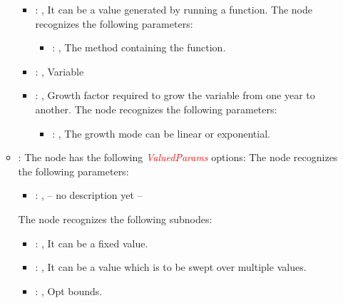\begin{itemize}
\begin{itemize}
\begin{itemize}
            \item {}: , 
              It can be a value generated by running a function.
              The  node recognizes the following parameters:
                \begin{itemize}
                  \item {}: , 
                    The method containing the function.
              \end{itemize}

            \item {}: , 
              Variable

            \item {}: , 
              Growth factor required to grow the variable from one year to another.
              The  node recognizes the following parameters:
                \begin{itemize}
                  \item {}: , 
                    The growth mode can be linear or exponential.
              \end{itemize}
          \end{itemize}

        \item {}:
          The node  has the following \textcolor{red}{\textit{ValuedParams}}
          options:
          The  node recognizes the following parameters:
            \begin{itemize}
              \item {}: , 
                -- no description yet --
          \end{itemize}

          The  node recognizes the following subnodes:
          \begin{itemize}
            \item {}: , 
              It can be a fixed value.

            \item {}: , 
              It can be a value which is to be swept over multiple values.

            \item {}: , 
              Opt bounds.


\end{itemize}
\end{itemize}
\end{itemize}
